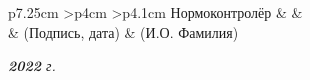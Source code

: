 \begin{titlepage}
\begin{table}[h!]
		\vspace{\baselineskip}
		
		\begin{signstabular}[0.7]{p{7.25cm} >{\centering\arraybackslash}p{4cm} >{\centering\arraybackslash}p{4.1cm}}
			Нормоконтролёр & \uline{\mbox{\hspace*{4cm}}} & \uline{\hfill \textbf{ } \hfill} \\
			& \scriptsize (Подпись, дата) & \scriptsize (И.О. Фамилия)
		\end{signstabular}
		
		\vspace{\baselineskip}

	\end{table}

	\vfill

	\begin{center}
		\normalsize \textit{\textbf{2022} г.}
	\end{center}
\end{titlepage}